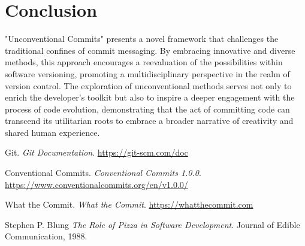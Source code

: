 \documentclass[12pt]{article}
\begin{document}
\section{Conclusion}
    "Unconventional Commits" presents a novel framework that challenges the traditional confines of commit messaging. By embracing innovative and diverse methods, this approach encourages a reevaluation of the possibilities within software versioning, promoting a multidisciplinary perspective in the realm of version control. The exploration of unconventional methods serves not only to enrich the developer's toolkit but also to inspire a deeper engagement with the process of code evolution, demonstrating that the act of committing code can transcend its utilitarian roots to embrace a broader narrative of creativity and shared human experience.

\begin{thebibliography}{9}
    Git. \textit{Git Documentation}. \url{https://git-scm.com/doc}

    Conventional Commits. \textit{Conventional Commits 1.0.0}. \url{https://www.conventionalcommits.org/en/v1.0.0/}

    What the Commit. \textit{What the Commit}. \url{https://whatthecommit.com}

    Stephen P. Blung \textit{The Role of Pizza in Software Development}. Journal of Edible Communication, 1988.
\end{thebibliography}
\end{document}
